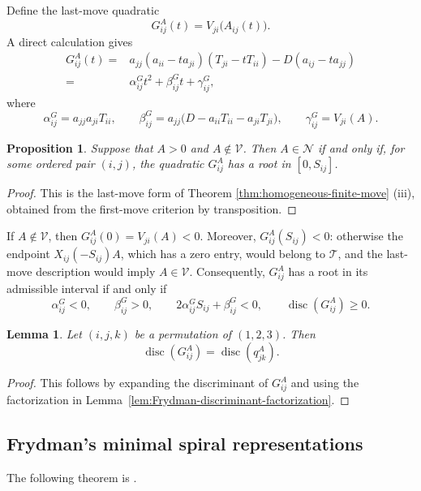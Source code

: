 \documentclass[11pt,onecolumn]{amsart}
\theoremstyle{plain}
\newtheorem{proposition}[theorem]{Proposition}
\newtheorem{lemma}[theorem]{Lemma}
\theoremstyle{definition}
\theoremstyle{remark}
\newcommand{\T}{\mathcal T}
\newcommand{\V}{\mathcal V}
\newcommand{\NH}{\mathcal N}
\newcommand{\disc}{\operatorname{disc}}
\begin{document}
Define the last-move quadratic
\[
G_{ij}^A(t)=V_{ji}\bigl(A_{ij}(t)\bigr).
\]
A direct calculation gives
\[
\begin{aligned}
	G_{ij}^A(t)
	={}&a_{jj}(a_{ii}-ta_{ji})(T_{ji}-tT_{ii})
	-D(a_{ij}-ta_{jj})\\
	={}&\alpha_{ij}^Gt^2+\beta_{ij}^Gt+\gamma_{ij}^G,
\end{aligned}
\]
where
\[
\alpha_{ij}^G=a_{jj}a_{ji}T_{ii},
\qquad
\beta_{ij}^G
=
a_{jj}\bigl(D-a_{ii}T_{ii}-a_{ji}T_{ji}\bigr),
\qquad
\gamma_{ij}^G=V_{ji}(A).
\]

\begin{proposition}
	\label{prop:last-move-quadratic-criterion}
	Suppose that \(A>0\) and \(A\notin\V\). Then \(A\in\NH\) if and only
	if, for some ordered pair \((i,j)\), the quadratic \(G_{ij}^A\) has a
	root in \([0,S_{ij}]\).
\end{proposition}

\begin{proof}
This is the last-move form of
Theorem \ref{thm:homogeneous-finite-move} (iii), obtained from the
first-move criterion by transposition.
\end{proof}

If \(A\notin\V\), then \(G_{ij}^A(0)=V_{ji}(A)<0\). Moreover,
\(G_{ij}^A(S_{ij})<0\): otherwise the endpoint
\(X_{ij}(-S_{ij})A\), which has a zero entry, would belong to
\(\T\), and the last-move description would imply \(A\in\V\).
Consequently, \(G_{ij}^A\) has a root in its admissible interval if
and only if
\[
\alpha_{ij}^G<0,
\qquad
\beta_{ij}^G>0,
\qquad
2\alpha_{ij}^GS_{ij}+\beta_{ij}^G<0,
\qquad
\disc(G_{ij}^A)\geq0.
\]

\begin{lemma}
	\label{lem:last-move-Frydman-discriminants}
	Let \((i,j,k)\) be a permutation of \((1,2,3)\). Then
	\[
	\disc(G_{ij}^A)=\disc(q_{jk}^A).
	\]
\end{lemma}

\begin{proof}
	This follows by expanding the discriminant of \(G_{ij}^A\) and using
	the factorization in
	Lemma~\ref{lem:Frydman-discriminant-factorization}.
\end{proof}


\subsection{Frydman's minimal spiral representations}
The following theorem is \cite[Theorem~3.1]{Frydman1980}.
\end{document}
